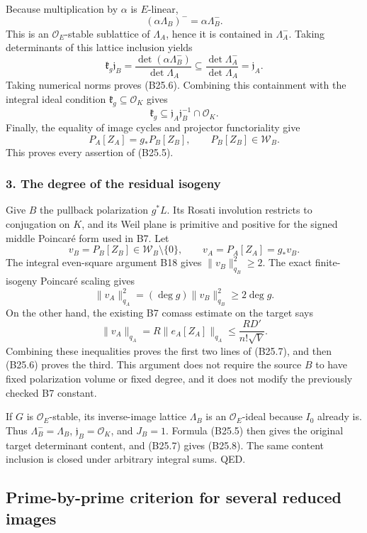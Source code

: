 Because multiplication by \(\alpha\) is \(E\)-linear, \[
 (\alpha\Lambda_B)^-=\alpha\Lambda_B^-.
\] This is an \(\mathcal O_E\)-stable sublattice of \(\Lambda_A\), hence it is contained in \(\Lambda_A^-\). Taking determinants of this lattice inclusion yields \[
 \mathfrak k_g\mathfrak j_B
 =\frac{\det(\alpha\Lambda_B^-)}{\det\Lambda_A}
 \subseteq\frac{\det\Lambda_A^-}{\det\Lambda_A}
 =\mathfrak j_A.
\] Taking numerical norms proves (B25.6). Combining this containment with the integral ideal condition \(\mathfrak k_g\subseteq\mathcal O_K\) gives \[
 \mathfrak k_g\subseteq
 \mathfrak j_A\mathfrak j_B^{-1}\cap\mathcal O_K.
\] Finally, the equality of image cycles and projector functoriality give \[
 P_A[Z_A]=g_*P_B[Z_B],\qquad P_B[Z_B]\in\mathscr W_B.
\] This proves every assertion of (B25.5).

\subsubsection{3. The degree of the residual isogeny}\label{the-degree-of-the-residual-isogeny}

Give \(B\) the pullback polarization \(g^*L\). Its Rosati involution restricts to conjugation on \(K\), and its Weil plane is primitive and positive for the signed middle Poincaré form used in B7. Let \[
 v_B=P_B[Z_B]\in\mathscr W_B\setminus\{0\},
 \qquad v_A=P_A[Z_A]=g_*v_B.
\] The integral even-square argument B18 gives \(\|v_B\|_{q_B}^2\ge2\). The exact finite-isogeny Poincaré scaling gives \[
 \|v_A\|_{q_A}^2=(\deg g)\|v_B\|_{q_B}^2\ge2\deg g.
\] On the other hand, the existing B7 comass estimate on the target says \[
 \|v_A\|_{q_A}=R\|e_A[Z_A]\|_{q_A}
 \le\frac{RD'}{n!\sqrt V}.
\] Combining these inequalities proves the first two lines of (B25.7), and then (B25.6) proves the third. This argument does not require the source \(B\) to have fixed polarization volume or fixed degree, and it does not modify the previously checked B7 constant.

If \(G\) is \(\mathcal O_E\)-stable, its inverse-image lattice \(\Lambda_B\) is an \(\mathcal O_E\)-ideal because \(I_0\) already is. Thus \(\Lambda_B^- =\Lambda_B\), \(\mathfrak j_B=\mathcal O_K\), and \(J_B=1\). Formula (B25.5) then gives the original target determinant content, and (B25.7) gives (B25.8). The same content inclusion is closed under arbitrary integral sums. QED.

\subsection{Prime-by-prime criterion for several reduced images}\label{prime-by-prime-criterion-for-several-reduced-images}

